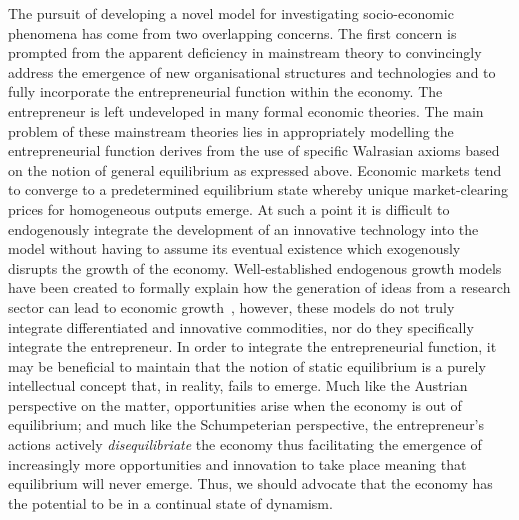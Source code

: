 The pursuit of developing a novel model for investigating socio-economic phenomena has come from two overlapping concerns. The first concern is prompted from the apparent deficiency in mainstream theory to convincingly address the emergence of new organisational structures and technologies and to fully incorporate the entrepreneurial function within the economy. The entrepreneur is left undeveloped in many formal economic theories. The main problem of these mainstream theories lies in appropriately modelling the entrepreneurial function derives from the use of specific Walrasian axioms based on the notion of general equilibrium as expressed above. Economic markets tend to converge to a predetermined equilibrium state whereby unique market-clearing prices for homogeneous outputs emerge. At such a point it is difficult to endogenously integrate the development of an innovative technology into the model without having to assume its eventual existence which exogenously disrupts the growth of the economy. Well-established endogenous growth models have been created to formally explain how the generation of ideas from a research sector can lead to economic growth~\citep{Romer1990}, however, these models do not truly integrate differentiated and innovative commodities, nor do they specifically integrate the entrepreneur. In order to integrate the entrepreneurial function, it may be beneficial to maintain that the notion of static equilibrium is a purely intellectual concept that, in reality, fails to emerge. Much like the Austrian perspective on the matter, opportunities arise when the economy is out of equilibrium; and much like the Schumpeterian perspective, the entrepreneur's actions actively \emph{disequilibriate} the economy thus facilitating the emergence of increasingly more opportunities and innovation to take place meaning that equilibrium will never emerge. Thus, we should advocate that the economy has the potential to be in a continual state of dynamism.

